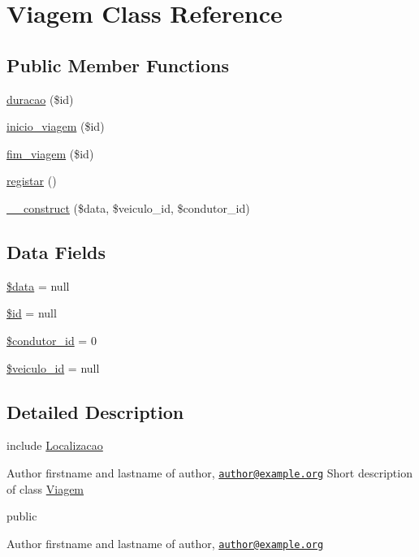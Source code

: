 \hypertarget{class_viagem}{}\section{Viagem Class Reference}
\label{class_viagem}
\subsection*{Public Member Functions}
\begin{DoxyCompactItemize}
\item 
\hyperlink{class_viagem_a2fc53fa90ae5dbb4e9ec6961122c9fc3}{duracao} (\$id)
\item 
\hyperlink{class_viagem_a3b0764c5b8568364a7b29c2980ce8257}{inicio\+\_\+viagem} (\$id)
\item 
\hyperlink{class_viagem_a11f32da7371c3c12126ddf3240f5be70}{fim\+\_\+viagem} (\$id)
\item 
\hyperlink{class_viagem_ac73fd1ef0f003bc98b2ef85d3d6b31b2}{registar} ()
\item 
\hyperlink{class_viagem_a67d4c2a2e8b7a6f3b22deb631583275a}{\+\_\+\+\_\+construct} (\$data, \$veiculo\+\_\+id, \$condutor\+\_\+id)
\end{DoxyCompactItemize}
\subsection*{Data Fields}
\begin{DoxyCompactItemize}
\item 
\hyperlink{class_viagem_a6efc15b5a2314dd4b5aaa556a375c6d6}{\$data} = null
\item 
\hyperlink{class_viagem_ae97941710d863131c700f069b109991e}{\$id} = null
\item 
\hyperlink{class_viagem_a14a552359ba3f6443d7ac1887ce4f496}{\$condutor\+\_\+id} = 0
\item 
\hyperlink{class_viagem_aa09ccdf3684621b143afc4d242e8428b}{\$veiculo\+\_\+id} = null
\end{DoxyCompactItemize}


\subsection{Detailed Description}
include \hyperlink{class_localizacao}{Localizacao}

\begin{DoxyAuthor}{Author}
firstname and lastname of author, \href{mailto:author@example.org}{\tt author@example.\+org} Short description of class \hyperlink{class_viagem}{Viagem}
\end{DoxyAuthor}
public \begin{DoxyAuthor}{Author}
firstname and lastname of author, \href{mailto:author@example.org}{\tt author@example.\+org} 
\end{DoxyAuthor}


